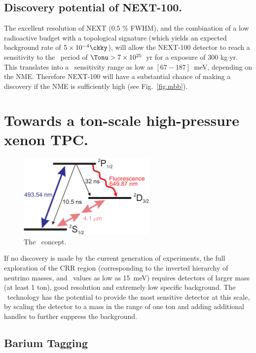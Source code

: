 \subsection{Discovery potential of NEXT-100.}

The excellent resolution of NEXT (0.5 \% FWHM), and the combination of a low radioactive budget with a topological signature (which yields an expected background rate of $5 \times 10^{-4} \ckky$), will allow the NEXT-100 detector to reach a sensitivity to the \bbonu\ period of $\Tonu > 7 \times 10^{25}$~yr for a exposure of 300 kg$\cdot$yr. This translates into a \mbb\ sensitivity range as low as $[67-187]$~meV, depending on the NME. Therefore NEXT-100 will have a substantial chance of making a discovery if the NME is sufficiently high (see Fig.~\ref{fig.mbb}). 

\section{Towards a ton-scale high-pressure xenon TPC.}

\begin{figure}
\centering
\includegraphics[width=0.60\textwidth]{img/levelscheme2.pdf}
\caption{\small The \BATA\ concept.} \label{fig.BATA}
\end{figure}

If no discovery is made by the current generation of experiments, the full exploration of the CRR region (corresponding to the inverted hierarchy of neutrino masses, and \mbb\ values as low as 15~meV) requires detectors of larger mass (at least 1 ton), good resolution and extremely low specific background. The \HPXE\ technology has the potential to provide the most sensitive detector at this scale, by scaling the detector to a mass in the range of one ton and adding additional handles to further suppress the background. 

\subsection{Barium Tagging}

